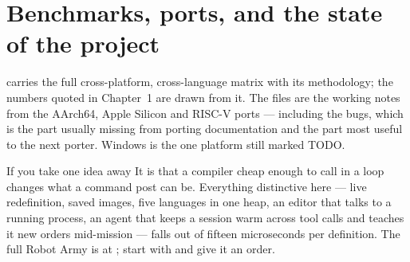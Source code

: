 \section{Benchmarks, ports, and the state of the project}

 carries the full cross-platform, cross-language matrix
with its methodology; the numbers quoted in Chapter~1 are drawn from it. The
 files are the working notes from the AArch64, Apple
Silicon and RISC-V ports --- including the bugs, which is the part usually
missing from porting documentation and the part most useful to the next
porter. Windows is the one platform still marked TODO.

\begin{callout}{If you take one idea away}
It is that a compiler cheap enough to call in a loop changes what a command
post can be. Everything distinctive here --- live redefinition, saved images,
five languages in one heap, an editor that talks to a running process, an
agent that keeps a session warm across tool calls and teaches it new orders
mid-mission --- falls out of fifteen microseconds per definition. The full
Robot Army is at \href{\ghbase}{}; start with
 and give it an order.
\end{callout}

